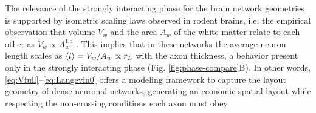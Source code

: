 \documentclass[nofootinbib,preprint,floatfix,titlepage,superscriptaddress]{revtex4} %
\begin{document}
The relevance of the strongly interacting phase for the brain network geometries 
\cite{azevedo2009equal, herculano2012remarkable, herculano2014brain}
is supported by isometric scaling laws observed in rodent brains, i.e. the empirical observation that volume $V_w$ and the area $A_w$ of the white matter relate to each other as $V_w\propto A_w^{1.5}$ \cite{herculano2012remarkable}. 
This implies that in these networks the average neuron length scales as $ \left<l\right> = V_w/A_w \propto r_L $ with the axon thickness, a behavior present only in the strongly interacting phase %
(Fig. \ref{fig:phase-compare}B). 
In other words,  \eqref{eq:Vfull}--\eqref{eq:Langevin0} offers a modeling framework to capture the layout geometry of dense neuronal networks, generating an economic spatial layout \cite{bullmore2012economy,sporns2004organization,kotter2001connectional} while respecting the non-crossing conditions each axon must obey.

\end{document}
